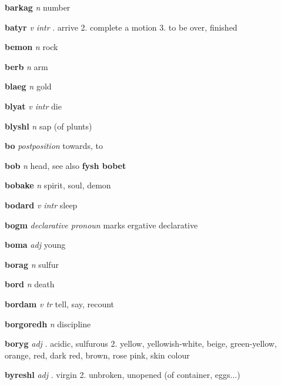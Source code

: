 \textbf{barkag}   \emph{n} \textperiodcentered number

\textbf{batyr}   \emph{v intr} . arrive 2. complete a motion 3. to be over, finished 

\textbf{bemon}   \emph{n} \textperiodcentered rock

\textbf{berb}   \emph{n} \textperiodcentered arm

\textbf{blaeg}   \emph{n} \textperiodcentered gold

\textbf{blyat}   \emph{v intr} \textperiodcentered die

\textbf{blyshl}   \emph{n} \textperiodcentered sap (of plunts)

\textbf{bo}   \emph{postposition} \textperiodcentered towards, to

\textbf{bob}   \emph{n} \textperiodcentered head, see also \textbf{fysh bobet}

\textbf{bobake}   \emph{n} \textperiodcentered spirit, soul, demon

\textbf{bodard}   \emph{v intr} \textperiodcentered sleep

\textbf{bogm}   \emph{declarative pronoun} \textperiodcentered marks ergative declarative

\textbf{boma}   \emph{adj} \textperiodcentered young

\textbf{borag}   \emph{n} \textperiodcentered sulfur

\textbf{bord}   \emph{n} \textperiodcentered death

\textbf{bordam}   \emph{v tr} \textperiodcentered tell, say, recount

\textbf{borgoredh}   \emph{n} \textperiodcentered discipline

\textbf{boryg}   \emph{adj} . acidic, sulfurous 2. yellow, yellowish-white, beige, green-yellow, orange, red, dark red, brown, rose pink, skin colour 

\textbf{byreshl}   \emph{adj} . virgin 2. unbroken, unopened (of container, eggs...) 


